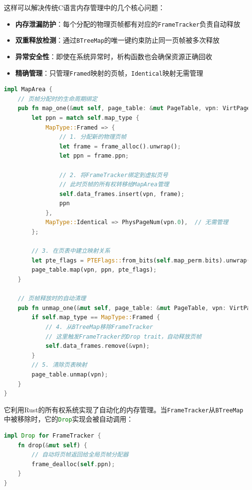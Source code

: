 这样可以解决传统C语言内存管理中的几个核心问题：

\begin{itemize}
    \item \textbf{内存泄漏防护}：每个分配的物理页帧都有对应的\lstinline[language=Rust]{FrameTracker}负责自动释放
    \item \textbf{双重释放检测}：通过\lstinline[language=Rust]{BTreeMap}的唯一键约束防止同一页帧被多次释放  
    \item \textbf{异常安全性}：即使在系统异常时，析构函数也会确保资源正确回收
    \item \textbf{精确管理}：只管理\lstinline[language=Rust]{Framed}映射的页帧，\lstinline[language=Rust]{Identical}映射无需管理
\end{itemize}

\begin{lstlisting}[language=Rust,caption={页帧生命周期管理机制}, label={lst:frame-lifecycle}]
impl MapArea {
    // 页帧分配时的生命周期绑定
    pub fn map_one(&mut self, page_table: &mut PageTable, vpn: VirtPageNum) {
        let ppn = match self.map_type {
            MapType::Framed => {
                // 1. 分配新的物理页帧  
                let frame = frame_alloc().unwrap();
                let ppn = frame.ppn;
                
                // 2. 将FrameTracker绑定到虚拟页号
                // 此时页帧的所有权转移给MapArea管理
                self.data_frames.insert(vpn, frame);
                ppn
            },
            MapType::Identical => PhysPageNum(vpn.0),  // 无需管理
        };
        
        // 3. 在页表中建立映射关系
        let pte_flags = PTEFlags::from_bits(self.map_perm.bits).unwrap();
        page_table.map(vpn, ppn, pte_flags);
    }
    
    // 页帧释放时的自动清理
    pub fn unmap_one(&mut self, page_table: &mut PageTable, vpn: VirtPageNum) {
        if self.map_type == MapType::Framed {
            // 4. 从BTreeMap移除FrameTracker
            // 这里触发FrameTracker的Drop trait，自动释放页帧
            self.data_frames.remove(&vpn);
        }
        // 5. 清除页表映射
        page_table.unmap(vpn);
    }
}
\end{lstlisting}

它利用Rust的所有权系统实现了自动化的内存管理。当\lstinline[language=Rust]{FrameTracker}从\lstinline[language=Rust]{BTreeMap}中被移除时，它的\lstinline[language=Rust]{Drop}实现会被自动调用：

\begin{lstlisting}[language=Rust,caption={FrameTracker自动释放机制}, label={lst:frame-tracker-drop}]
impl Drop for FrameTracker {
    fn drop(&mut self) {
        // 自动将页帧返回给全局页帧分配器
        frame_dealloc(self.ppn);
    }
}
\end{lstlisting}

